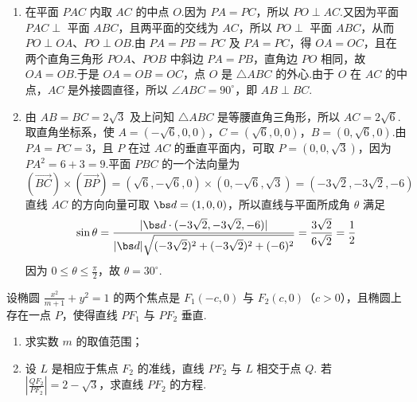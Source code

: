 \begin{solution}
\begin{enumerate}
\item 在平面 \(PAC\) 内取 \(AC\) 的中点 \(O\).因为 \(PA=PC\)，所以 \(PO\perp AC\).又因为平面 \(PAC\perp\) 平面 \(ABC\)，且两平面的交线为 \(AC\)，所以 \(PO\perp\) 平面 \(ABC\)，从而 \(PO\perp OA\)、\(PO\perp OB\).由 \(PA=PB=PC\) 及 \(PA=PC\)，得 \(OA=OC\)，且在两个直角三角形 \(POA\)、\(POB\) 中斜边 \(PA=PB\)，直角边 \(PO\) 相同，故 \(OA=OB\).于是 \(OA=OB=OC\)，点 \(O\) 是 \(\triangle ABC\) 的外心.由于 \(O\) 在 \(AC\) 的中点，\(AC\) 是外接圆直径，所以 \(\angle ABC=90^\circ\)，即 \(AB\perp BC\).
\item 由 \(AB=BC=2\sqrt3\) 及上问知 \(\triangle ABC\) 是等腰直角三角形，所以 \(AC=2\sqrt6\).取直角坐标系，使 \(A=(-\sqrt6,0,0)\)，\(C=(\sqrt6,0,0)\)，\(B=(0,\sqrt6,0)\).由 \(PA=PC=3\)，且 \(P\) 在过 \(AC\) 的垂直平面内，可取 \(P=(0,0,\sqrt3)\)，因为 \(PA^2=6+3=9\).平面 \(PBC\) 的一个法向量为
\[
(\overrightarrow{BC})\times(\overrightarrow{BP})
=(\sqrt6,-\sqrt6,0)\times(0,-\sqrt6,\sqrt3)
=(-3\sqrt2,-3\sqrt2,-6)
\]
直线 \(AC\) 的方向向量可取 \(\bs d=(1,0,0)\)，所以直线与平面所成角 \(\theta\) 满足
\[
\sin\theta=\frac{|\bs d\cdot(-3\sqrt2,-3\sqrt2,-6)|}{|\bs d|\sqrt{(-3\sqrt2)^2+(-3\sqrt2)^2+(-6)^2}}=\frac{3\sqrt2}{6\sqrt2}=\frac12
\]
因为 \(0\leqslant\theta\leqslant\frac\pi2\)，故 \(\theta=30^\circ\).
\end{enumerate}
\end{solution}

\begin{problem}
设椭圆 \(\frac{x^2}{m+1} + y^2 = 1\) 的两个焦点是 \(F_{1}(-c,0)\) 与 \(F_{2}(c,0)\)（\(c > 0\)），且椭圆上存在一点 \(P\)，使得直线 \(PF_{1}\) 与 \(PF_{2}\) 垂直.

\begin{enumerate}
\item 求实数 \(m\) 的取值范围；
\item 设 \(L\) 是相应于焦点 \(F_{2}\) 的准线，直线 \(PF_{2}\) 与 \(L\) 相交于点 \(Q\). 若 \(\left|\frac{QF_{2}}{PF_{2}}\right| = 2 - \sqrt{3}\)，求直线 \(PF_{2}\) 的方程.
\end{enumerate}
\end{problem}

